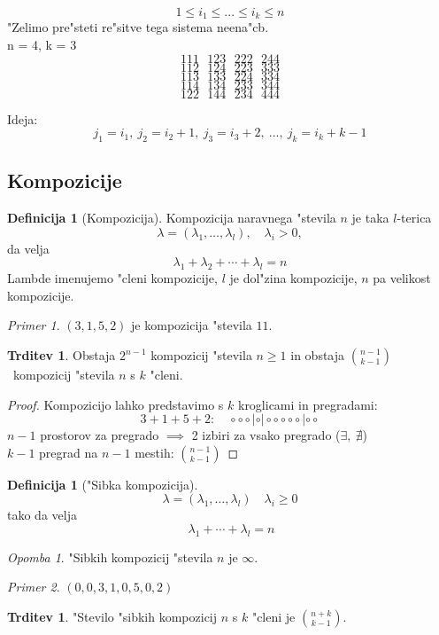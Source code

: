 \documentclass[a4paper,12pt]{article}
\theoremstyle{definition}
\newtheorem{defn}[counter]{Definicija}
\newtheorem{claim}[counter]{Trditev}
\theoremstyle{remark}
\newtheorem*{ex}{Primer}
\newtheorem*{rem}{Opomba}
\begin{document}
\label{TODO: what is this??}
\[1 \leqslant i_1 \leqslant ... \leqslant i_k \leqslant n\]
"Zelimo pre"steti re"sitve tega sistema neena"cb.\\
n = 4, k = 3
\[1 1 1 \ \ \ 1 2 3 \ \ \ 2 2 2 \ \ \ 2 4 4\]
\[1 1 2 \ \ \ 1 2 4 \ \ \ 2 2 3 \ \ \ 3 3 3\]
\[1 1 3 \ \ \ 1 3 3 \ \ \ 2 2 4 \ \ \ 3 3 4\]
\[1 1 4 \ \ \ 1 3 4 \ \ \ 2 3 3 \ \ \ 3 4 4\]
\[1 2 2 \ \ \ 1 4 4 \ \ \ 2 3 4 \ \ \ 4 4 4\]

Ideja:
\[j_1 = i_1, \ j_2 = i_2 + 1, \ j_3 = i_3 + 2, \ ..., \ j_k = i_k + k - 1 \]

\subsection{Kompozicije}
\begin{defn}[Kompozicija]
	Kompozicija naravnega "stevila $n$ je taka $l$-terica
	\[ \lambda = (\lambda_1, \ldots, \lambda_l), \quad \lambda_i > 0,\]
	da velja
	\[\lambda_1 + \lambda_2 + \cdots + \lambda_l = n\]
	Lambde imenujemo "cleni kompozicije, $l$ je dol"zina kompozicije, $n$ pa velikost kompozicije.
\end{defn}
\begin{ex}
	$(3, 1, 5, 2)$ je kompozicija "stevila $11$.
\end{ex}


\begin{claim}
	Obstaja $2^{n-1}$ kompozicij "stevila $n \geqslant 1$ in obstaja $\binom{n - 1}{k - 1}$~kompozicij "stevila $n$ s $k$ "cleni.
\end{claim}

\begin{proof}
	Kompozicijo lahko predstavimo s $k$ kroglicami in pregradami:
	\[
		3 + 1 + 5 + 2: \quad
		\circ \circ \circ|\circ|\circ \circ \circ \circ \circ |\circ \circ
	\]
	$n - 1$ prostorov za pregrado $\implies$ 2 izbiri za vsako pregrado ($\exists, \ \nexists$)\\
	$k - 1$ pregrad na $n - 1$ mestih: $\binom{n - 1}{k - 1}$
\end{proof}

\begin{defn}["Sibka kompozicija]
	\[ \lambda = (\lambda_1, \ldots, \lambda_l) \quad \lambda_i \geqslant 0\]
	tako da velja
	\[ \ \lambda_1 + \cdots + \lambda_l = n\]
\end{defn}
\begin{rem}
	"Sibkih kompozicij "stevila $n$ je $\infty$.
\end{rem}
\begin{ex}
	$(0, 0, 3, 1, 0, 5, 0, 2)$
\end{ex}
\begin{claim}
	"Stevilo "sibkih kompozicij $n$ s $k$ "cleni je $\binom{n + k}{k - 1}$.
\end{claim}
\end{document}

